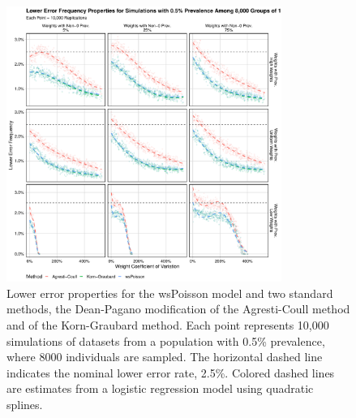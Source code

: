\begin{figure}
\centering
\includegraphics[width=0.8\textwidth]{perfect_lower_error_frequency_8000_groups_0_005_prev}
\caption{Lower error properties for the wsPoisson model and two standard methods, the Dean-Pagano modification of the Agresti-Coull method and of the Korn-Graubard method.
Each point represents 10,000 simulations of datasets from a population with 0.5\% prevalence, where 8000 individuals are sampled.
The horizontal dashed line indicates the nominal lower error rate, 2.5\%.
Colored dashed lines are estimates from a logistic regression model using quadratic splines.}
\label{ch_3:fig:perfect_lower_error_frequency_8000_groups_0_005_prev}
\end{figure}

